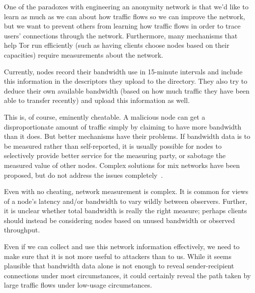 \documentclass{llncs}
\begin{document}
One of the paradoxes with engineering an anonymity network is that we'd like
to learn as much as we can about how traffic flows so we can improve the
network, but we want to prevent others from learning how traffic flows in
order to trace users' connections through the network.  Furthermore, many
mechanisms that help Tor run efficiently (such as having clients choose nodes
based on their capacities) require measurements about the network.

Currently, nodes record their bandwidth use in 15-minute intervals and
include this information in the descriptors they upload to the directory.
They also try to deduce their own available bandwidth (based on how
much traffic they have been able to transfer recently) and upload this
information as well.

This is, of course, eminently cheatable.  A malicious node can get a
disproportionate amount of traffic simply by claiming to have more bandwidth
than it does.  But better mechanisms have their problems.  If bandwidth data
is to be measured rather than self-reported, it is usually possible for
nodes to selectively provide better service for the measuring party, or
sabotage the measured value of other nodes.  Complex solutions for
mix networks have been proposed, but do not address the issues
completely~\cite{mix-acc,casc-rep}.

Even with no cheating, network measurement is complex.  It is common
for views of a node's latency and/or bandwidth to vary wildly between
observers.  Further, it is unclear whether total bandwidth is really
the right measure; perhaps clients should instead be considering nodes
based on unused bandwidth or observed throughput.



Even if we can collect and use this network information effectively, we need
to make sure that it is not more useful to attackers than to us.  While it
seems plausible that bandwidth data alone is not enough to reveal
sender-recipient connections under most circumstances, it could certainly
reveal the path taken by large traffic flows under low-usage circumstances.
\end{document}
